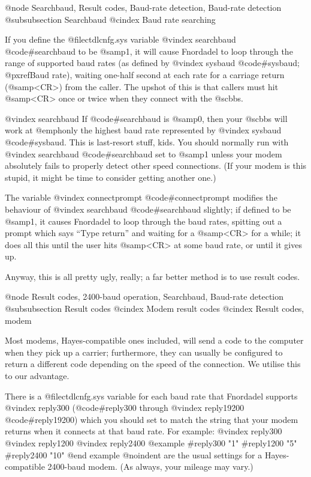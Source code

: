 {{@node Searchbaud, Result codes, Baud-rate detection, Baud-rate detection
@subsubsection Searchbaud
@cindex Baud rate searching

If you define the @file{ctdlcnfg.sys} variable
@vindex searchbaud
@code{#searchbaud} to be @samp{1}, it will cause Fnordadel to
loop through the range of supported baud rates (as
defined by
@vindex sysbaud
@code{#sysbaud}; @pxref{Baud rate}), waiting
one-half second at each rate for a carriage return
(@samp{<CR>}) from the caller.  The upshot of this is that
callers must hit @samp{<CR>} once or twice when they
connect with the @sc{bbs}.

@vindex searchbaud
If @code{#searchbaud} is @samp{0}, then your @sc{bbs} will
work at @emph{only} the highest baud rate represented by
@vindex sysbaud
@code{#sysbaud}.  This is last-resort stuff, kids.  You
should normally run with
@vindex searchbaud
@code{#searchbaud} set to @samp{1}
unless your modem absolutely fails to properly
detect other speed connections.  (If your modem is this stupid, it might
be time to consider getting another one.)

The variable
@vindex connectprompt
@code{#connectprompt} modifies
the behaviour of
@vindex searchbaud
@code{#searchbaud} slightly; if defined to be @samp{1}, it
causes Fnordadel to loop through the baud rates,
spitting out a prompt which says ``Type return'' and
waiting for a @samp{<CR>} for a while; it does all this
until the user hits @samp{<CR>} at some baud rate, or
until it gives up.

Anyway, this is all pretty ugly, really;
a far better method is to use result codes.

@node Result codes, 2400-baud operation, Searchbaud, Baud-rate detection
@subsubsection Result codes
@cindex Modem result codes
@cindex Result codes, modem

Most modems, Hayes-compatible ones
included, will send a code to the computer when
they pick up a carrier; furthermore, they can
usually be configured to return a different code
depending on the speed of the connection.  We
utilise this to our advantage.

There is a @file{ctdlcnfg.sys} variable for each
baud rate that Fnordadel supports
@vindex reply300
(@code{#reply300}
through
@vindex reply19200
@code{#reply19200}) which you should set to
match the string that your modem returns when it
connects at that baud rate.  For example:
@vindex reply300
@vindex reply1200
@vindex reply2400
@example
#reply300 "1"
#reply1200 "5"
#reply2400 "10"
@end example
@noindent
are the usual settings for a Hayes-compatible
2400-baud modem.  (As always, your mileage may
vary.)

}}
